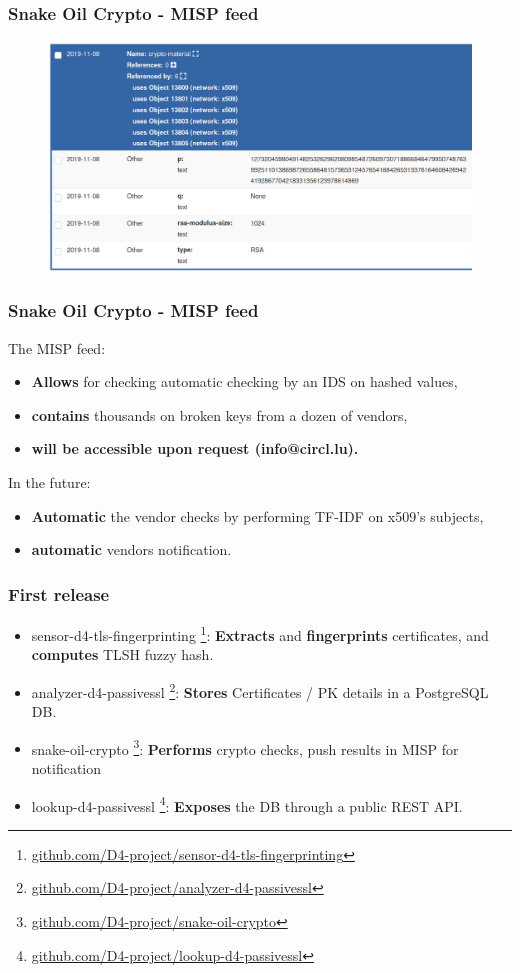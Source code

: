 \documentclass{beamer}
\begin{document}
\begin{frame}
   \frametitle{Snake Oil Crypto - MISP feed}
\begin{figure}
\centering
\includegraphics[width=\textwidth]{misp.png}
\end{figure}

\end{frame}

\begin{frame}
   \frametitle{Snake Oil Crypto - MISP feed}
   The MISP feed:
   \begin{itemize}
     \item {\bf Allows} for checking automatic checking by an IDS on hashed values,
     \item {\bf contains} thousands on broken keys from a dozen of vendors,
     \item {\bf will be accessible upon request (info@circl.lu).}
   \end{itemize}

   In the future:
    \begin{itemize}
     \item {\bf Automatic} the vendor checks by performing TF-IDF on x509's subjects, 
     \item {\bf automatic} vendors notification.
     \end{itemize}

\end{frame}


\begin{frame}
  \frametitle{First release}
  \begin{itemize}
  \item[\checkmark] sensor-d4-tls-fingerprinting
    \footnote{\url{github.com/D4-project/sensor-d4-tls-fingerprinting}}:
    {\bf Extracts} and {\bf fingerprints} certificates, and {\bf computes} TLSH fuzzy hash.
  \item[\checkmark] analyzer-d4-passivessl
    \footnote{\url{github.com/D4-project/analyzer-d4-passivessl}}:
    {\bf Stores} Certificates / PK details in a PostgreSQL DB.
  \item snake-oil-crypto 
    \footnote{\url{github.com/D4-project/snake-oil-crypto}}:
    {\bf Performs} crypto checks, push results in MISP for notification
  \item lookup-d4-passivessl
    \footnote{\url{github.com/D4-project/lookup-d4-passivessl}}:
    {\bf Exposes} the DB through a public REST API.
  \end{itemize}
\end{frame}
\end{document}

